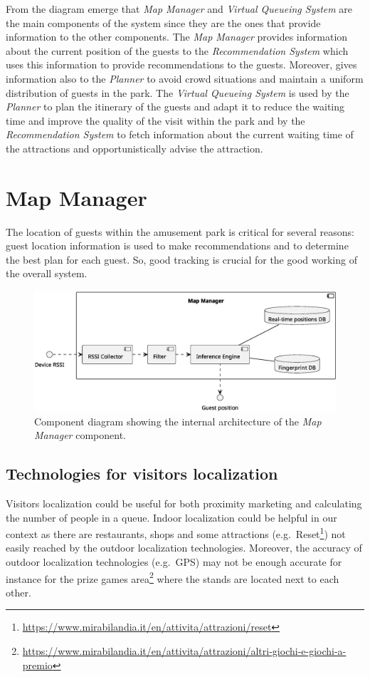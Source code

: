 From the diagram emerge that \textit{Map Manager} and \textit{Virtual Queueing System} are the main components of the system since they are the ones
that provide information to the other components. The \textit{Map Manager} provides information about the current position of the guests
to the \textit{Recommendation System} which uses this information to provide recommendations to the guests. Moreover, gives information also to the
\textit{Planner} to avoid crowd situations and maintain a uniform distribution of guests in the park. The \textit{Virtual Queueing System} is used by
the \textit{Planner} to plan the itinerary of the guests and adapt it to reduce the waiting time and improve the quality of the visit within the park
and by the \textit{Recommendation System} to fetch information about the current waiting time of the attractions and opportunistically advise the attraction.

\section{Map Manager}

The location of guests within the amusement park is critical for several reasons: guest location information is used to make recommendations and to determine the best plan for each guest. So, good tracking is crucial for the good working of the overall system.

\begin{figure}[H]
	\centering
	\includegraphics[width=\textwidth]{img/map-manager.eps}
	\caption{Component diagram showing the internal architecture of the \textit{Map Manager} component.
	}
	\label{fig:map-manager}
\end{figure}

\subsection{Technologies for visitors localization}\label{sec:technologies}
Visitors localization could be useful for both proximity marketing and calculating the number of people in a queue.
Indoor localization could be helpful in our context as there are restaurants, shops and some attractions
(e.g.\ Reset\footnote{\url{https://www.mirabilandia.it/en/attivita/attrazioni/reset}}) not easily reached by the outdoor localization technologies.
Moreover, the accuracy of outdoor localization technologies (e.g.\ GPS) may not be enough accurate for instance for the prize games area\footnote{\url{https://www.mirabilandia.it/en/attivita/attrazioni/altri-giochi-e-giochi-a-premio}}
where the stands are located next to each other.

